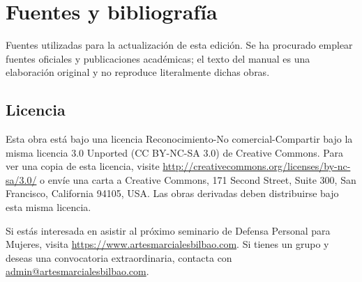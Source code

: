 \chapter{Fuentes y bibliografía}

Fuentes utilizadas para la actualización de esta edición. Se ha procurado emplear fuentes oficiales y publicaciones académicas; el texto del manual es una elaboración original y no reproduce literalmente dichas obras.

\nocite{codigopenal1995, alertcops, igualdad, navarro}

\renewcommand{\bibsection}{}


\section*{Licencia}

Esta obra está bajo una licencia Reconocimiento-No comercial-Compartir bajo la misma licencia 3.0 Unported (CC BY-NC-SA 3.0) de Creative Commons. Para ver una copia de esta licencia, visite \url{http://creativecommons.org/licenses/by-nc-sa/3.0/} o envíe una carta a Creative Commons, 171 Second Street, Suite 300, San Francisco, California 94105, USA. Las obras derivadas deben distribuirse bajo esta misma licencia.

\newpage
\begin{aviso}
Si estás interesada en asistir al próximo seminario de Defensa Personal para Mujeres, visita \url{https://www.artesmarcialesbilbao.com}. Si tienes un grupo y deseas una convocatoria extraordinaria, contacta con \href{mailto:admin@artesmarcialesbilbao.com}{admin@artesmarcialesbilbao.com}.
\end{aviso}
